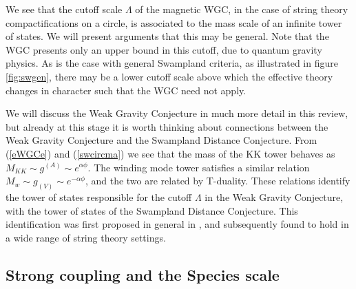 \documentclass[11pt,a4paper]{article}
\numberwithin{equation}{section}
\numberwithin{table}{section}\setlength{\multlinegap}{25pt}
\begin{document}
We see that the cutoff scale $\Lambda$ of the magnetic WGC, in the case of string theory compactifications on a circle, is associated to the mass scale of an infinite tower of states. We will present arguments that this may be general. Note that the WGC presents only an upper bound in this cutoff, due to quantum gravity physics. As is the case with general Swampland criteria, as illustrated in figure \ref{fig:swgen}, there may be a lower cutoff scale above which the effective theory changes in character such that the WGC need not apply.  

We will discuss the Weak Gravity Conjecture in much more detail in this review, but already at this stage it is worth thinking about connections between the Weak Gravity Conjecture and the Swampland Distance Conjecture. From (\ref{eWGCe}) and (\ref{swcircma}) we see that the mass of the KK tower behaves as $M_{KK} \sim g^{(A)} \sim e^{\alpha \phi}$. The winding mode tower satisfies a similar relation $M_{w} \sim g_{(V)} \sim e^{-\alpha \phi}$, and the two are related by T-duality. These relations identify the tower of states responsible for the cutoff $\Lambda$ in the Weak Gravity Conjecture, with the tower of states of the Swampland Distance Conjecture. This identification was first proposed in general in \cite{Heidenreich:2016aqi,Klaewer:2016kiy}, and subsequently found to hold in a wide range of string theory settings. 

%
%
%
%
%
%

\subsection{Strong coupling and the Species scale}
\label{sec:fespec}
\end{document}
